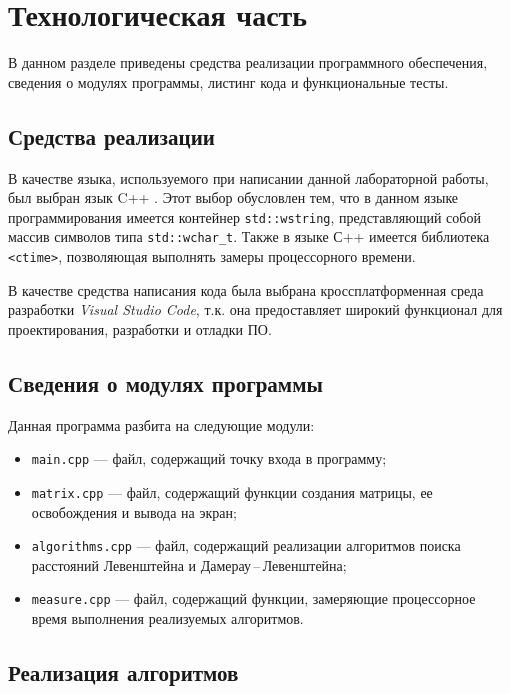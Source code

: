 \chapter{Технологическая часть}

В данном разделе приведены средства реализации программного обеспечения, сведения о модулях программы, листинг кода и функцио\-нальные тесты.

\section{Средства реализации}

В качестве языка, используемого при написании данной лабора\-торной работы, был выбран язык C++ \cite{cpp-lang}. Этот выбор обусловлен тем, что в данном языке программирования имеется контей\-нер \texttt{std::wstring}, представляющий собой массив символов типа \texttt{std::wchar\_t}. Также в языке С++ имеется библиотека \texttt{<ctime>}, позволяющая выполнять замеры процессорного времени.

В качестве средства написания кода была выбрана кроссплатфор\-менная среда разработки \textit{Visual Studio Code}, т.к. она предоставляет ши\-рокий функционал для проектирования, разработки и отладки ПО.

\section{Сведения о модулях программы}

Данная программа разбита на следующие модули:

\begin{itemize}
    \item \texttt{main.cpp} --- файл, содержащий точку входа в программу;
    \item \texttt{matrix.cpp} --- файл, содержащий функции создания матрицы, ее освобождения и вывода на экран;
    \item \texttt{algorithms.cpp} --- файл, содержащий реализации алгоритмов поиска расстояний Левенштейна и Дамерау\,--\,Левенштейна;
    \item \texttt{measure.cpp} --- файл, содержащий функции, замеряющие процес\-сорное время выполнения реализуемых алгоритмов.
\end{itemize}

\section{Реализация алгоритмов}

